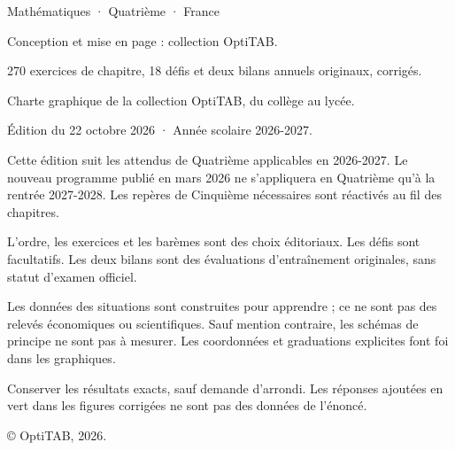 \thispagestyle{empty}\vspace*{\fill}
\begin{minipage}{128mm}\fontsize{9}{13}\selectfont\color{otMuted}
{\otSemi\color{otInk}Mathématiques · Quatrième · France}\par\medskip
Conception et mise en page : collection OptiTAB.\par
270 exercices de chapitre, 18 défis et deux bilans annuels originaux, corrigés.\par
Charte graphique de la collection OptiTAB, du collège au lycée.\par\bigskip
Édition du 22 octobre 2026 · Année scolaire 2026-2027.\par\bigskip
Cette édition suit les attendus de Quatrième applicables en 2026-2027.
Le nouveau programme publié en mars 2026 ne s’appliquera en Quatrième
qu’à la rentrée 2027-2028. Les repères de Cinquième nécessaires sont réactivés
au fil des chapitres.\par\bigskip
L’ordre, les exercices et les barèmes sont des choix éditoriaux. Les défis sont
facultatifs. Les deux bilans sont des évaluations d’entraînement originales,
sans statut d’examen officiel.\par\bigskip
Les données des situations sont construites pour apprendre ; ce ne sont pas
des relevés économiques ou scientifiques. Sauf mention contraire, les
schémas de principe ne sont pas à mesurer. Les coordonnées et graduations
explicites font foi dans les graphiques.\par\bigskip
Conserver les résultats exacts, sauf demande d’arrondi. Les réponses ajoutées
en vert dans les figures corrigées ne sont pas des données de l’énoncé.\par\bigskip
© OptiTAB, 2026.\par\otSite
\end{minipage}\clearpage
